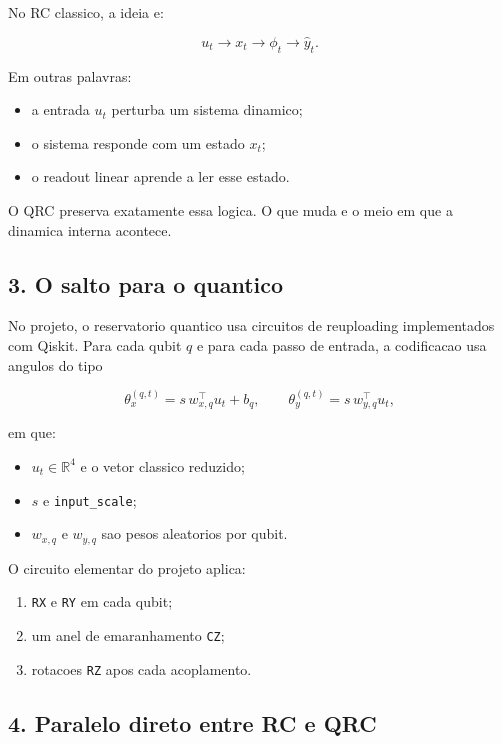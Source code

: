 \documentclass[12pt]{article}
\providecommand{\tightlist}{%
          \setlength{\itemsep}{0pt}\setlength{\parskip}{0pt}}
\begin{document}
No RC classico, a ideia e:

\[
u_t \longrightarrow x_t \longrightarrow \phi_t \longrightarrow \hat{y}_t.
\]

Em outras palavras:

\begin{itemize}
\tightlist
\item
  a entrada \(u_t\) perturba um sistema dinamico;
\item
  o sistema responde com um estado \(x_t\);
\item
  o readout linear aprende a ler esse estado.
\end{itemize}

O QRC preserva exatamente essa logica. O que muda e o meio em que a dinamica interna acontece.

\subsection{3. O salto para o quantico}\label{3-o-salto-para-o-quantico}

No projeto, o reservatorio quantico usa circuitos de reuploading implementados com Qiskit. Para cada qubit \(q\) e para cada passo de entrada, a codificacao usa angulos do tipo

\[
\theta^{(q,t)}_x = s \, w_{x,q}^\top u_t + b_q,
\qquad
\theta^{(q,t)}_y = s \, w_{y,q}^\top u_t,
\]

em que:

\begin{itemize}
\tightlist
\item
  \(u_t \in \mathbb{R}^4\) e o vetor classico reduzido;
\item
  \(s\) e \texttt{input\_scale};
\item
  \(w_{x,q}\) e \(w_{y,q}\) sao pesos aleatorios por qubit.
\end{itemize}

O circuito elementar do projeto aplica:

\begin{enumerate}
\def\labelenumi{\arabic{enumi}.}
\tightlist
\item
  \texttt{RX} e \texttt{RY} em cada qubit;
\item
  um anel de emaranhamento \texttt{CZ};
\item
  rotacoes \texttt{RZ} apos cada acoplamento.
\end{enumerate}

\subsection{4. Paralelo direto entre RC e QRC}\label{4-paralelo-direto-entre-rc-e-qrc}
\end{document}
